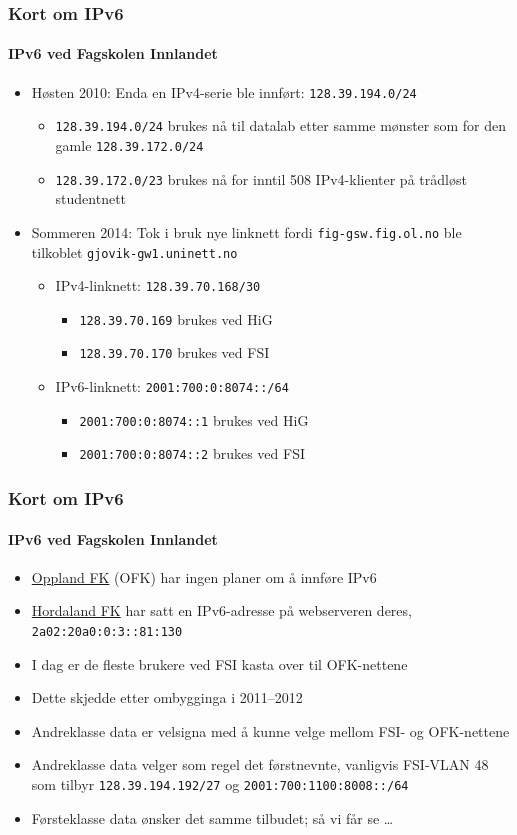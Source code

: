 \begin{frame}%
  \frametitle{Kort om IPv6}
  \framesubtitle{IPv6 ved Fagskolen Innlandet}
  \begin{itemize}[<+->]
  \item Høsten 2010: Enda en IPv4-serie ble innført:
    \texttt{128.39.194.0/24}
    \begin{itemize}[<+->]
    \item \texttt{128.39.194.0/24} brukes nå til datalab etter samme
      mønster som for den gamle \texttt{128.39.172.0/24}
    \item \texttt{128.39.172.0/\alert{23}} brukes nå for inntil 508
      IPv4-klienter på trådløst studentnett
    \end{itemize}
  \item Sommeren 2014: Tok i bruk nye linknett fordi
    \texttt{fig-gsw.fig.ol.no} ble tilkoblet
    \texttt{gjovik-gw1.uninett.no}
    \begin{itemize}[<+->]
    \item IPv4-linknett: \texttt{128.39.70.168/30}
      \begin{itemize}[<+->]
      \item \texttt{128.39.70.169} brukes ved HiG
      \item \texttt{128.39.70.170} brukes ved FSI
      \end{itemize}
    \item IPv6-linknett: \texttt{2001:700:0:8074::/64}
      \begin{itemize}[<+->]
      \item \texttt{2001:700:0:8074::1} brukes ved HiG
      \item \texttt{2001:700:0:8074::2} brukes ved FSI
      \end{itemize}
    \end{itemize}
  \end{itemize}
\end{frame}

\begin{frame}%
  \frametitle{Kort om IPv6}
  \framesubtitle{IPv6 ved Fagskolen Innlandet}
  \begin{itemize}[<+->]
  \item \href{http://www.oppland.no/}{Oppland FK} (OFK) har ingen
    planer om å innføre IPv6
  \item \href{http://www.hordaland.no/}{Hordaland FK} har satt en
    IPv6-adresse på webserveren deres, \texttt{2a02:20a0:0:3::81:130}
  \item I dag er de fleste brukere ved FSI kasta over til OFK-nettene
  \item Dette skjedde etter ombygginga i 2011--2012
  \item Andreklasse data er velsigna med å kunne velge mellom FSI- og
    OFK-nettene
  \item Andreklasse data velger som regel det førstnevnte, vanligvis
    FSI-VLAN 48 som tilbyr \texttt{128.39.194.192/27} og
    \texttt{2001:700:1100:8008::/64}
  \item Førsteklasse data ønsker det samme tilbudet; så vi får se \dots
  \end{itemize}
\end{frame}


